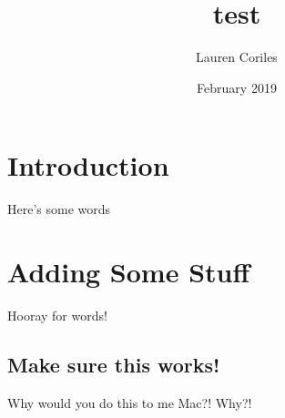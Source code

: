 \documentclass{article}
\title{test}
\author{Lauren Coriles}
\date{February 2019}
\begin{document}
\maketitle

\section{Introduction}
Here's some words

\section{Adding Some Stuff}
Hooray for words!

\subsection{Make sure this works!}
Why would you do this to me Mac?! Why?!
\end{document}
